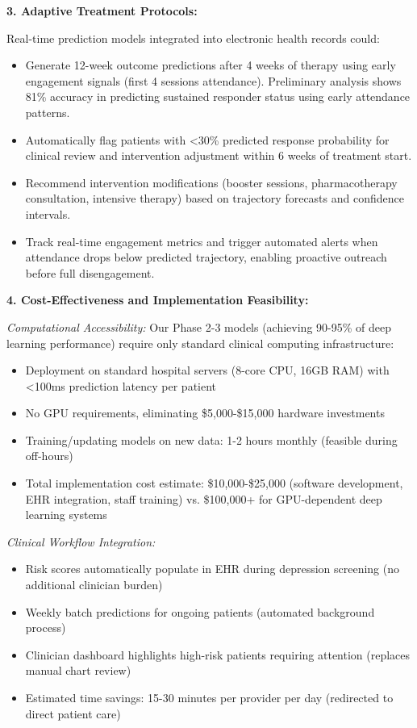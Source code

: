 \documentclass[conference]{IEEEtran}
\begin{document}
\textbf{3. Adaptive Treatment Protocols:}

Real-time prediction models integrated into electronic health records could:
\begin{itemize}
    \item Generate 12-week outcome predictions after 4 weeks of therapy using early engagement signals (first 4 sessions attendance). Preliminary analysis shows 81\% accuracy in predicting sustained responder status using early attendance patterns.
    \item Automatically flag patients with <30\% predicted response probability for clinical review and intervention adjustment within 6 weeks of treatment start.
    \item Recommend intervention modifications (booster sessions, pharmacotherapy consultation, intensive therapy) based on trajectory forecasts and confidence intervals.
    \item Track real-time engagement metrics and trigger automated alerts when attendance drops below predicted trajectory, enabling proactive outreach before full disengagement.
\end{itemize}

\textbf{4. Cost-Effectiveness and Implementation Feasibility:}

\textit{Computational Accessibility:} Our Phase 2-3 models (achieving 90-95\% of deep learning performance) require only standard clinical computing infrastructure:
\begin{itemize}
    \item Deployment on standard hospital servers (8-core CPU, 16GB RAM) with <100ms prediction latency per patient
    \item No GPU requirements, eliminating \$5,000-\$15,000 hardware investments
    \item Training/updating models on new data: 1-2 hours monthly (feasible during off-hours)
    \item Total implementation cost estimate: \$10,000-\$25,000 (software development, EHR integration, staff training) vs. \$100,000+ for GPU-dependent deep learning systems
\end{itemize}

\textit{Clinical Workflow Integration:}
\begin{itemize}
    \item Risk scores automatically populate in EHR during depression screening (no additional clinician burden)
    \item Weekly batch predictions for ongoing patients (automated background process)
    \item Clinician dashboard highlights high-risk patients requiring attention (replaces manual chart review)
    \item Estimated time savings: 15-30 minutes per provider per day (redirected to direct patient care)
\end{itemize}
\end{document}
